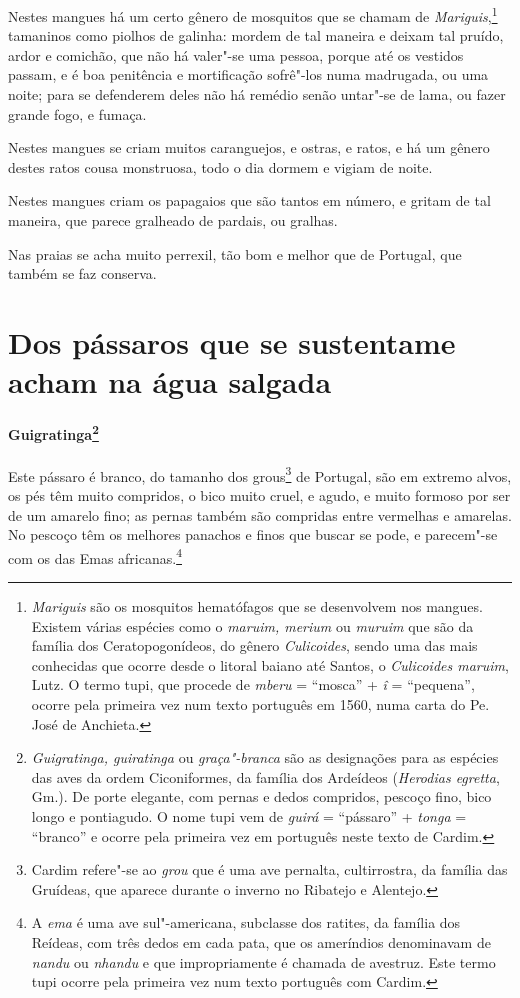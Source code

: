  Nestes mangues há um certo gênero de mosquitos que se chamam de
\textit{Mariguis},\footnote{ \textit{Mariguis} são os mosquitos
hematófagos que se desenvolvem nos mangues. Existem várias espécies
como o \textit{maruim, merium} ou \textit{muruim} que são da família
dos Ceratopogonídeos, do gênero \textit{Culicoides}, sendo uma das mais
conhecidas que ocorre desde o litoral baiano até Santos, o
\textit{Culicoides maruim}, Lutz. O termo tupi, que procede de
\textit{mberu} = ``mosca'' + \textit{î} = ``pequena'', ocorre pela primeira
vez num texto português em 1560, numa carta do Pe. José de
Anchieta.} tamaninos como piolhos de galinha: mordem de tal maneira e
deixam tal pruído, ardor e comichão, que não há valer"-se uma pessoa,
porque até os vestidos passam, e é boa penitência e mortificação
sofrê"-los numa madrugada, ou uma noite; para se defenderem deles não há
remédio senão untar"-se de lama, ou fazer grande fogo, e fumaça.

 Nestes mangues se criam muitos caranguejos, e ostras, e ratos, e há um
gênero destes ratos cousa monstruosa, todo o dia dormem e vigiam de noite.

 Nestes mangues criam os papagaios que são tantos em número, e gritam de
tal maneira, que parece gralheado de pardais, ou gralhas.

 Nas praias se acha muito perrexil, tão bom e melhor que de Portugal, 
que também se faz conserva.


\section[Dos pássaros que se sustentam e acham na água salgada]{Dos pássaros que se sustentam\break e acham na água salgada}
\paragraph{Guigratinga\footnote{ \textit{Guigratinga,
guiratinga} ou \textit{graça"-branca} são as designações para as
espécies das aves da ordem Ciconiformes, da família dos Ardeídeos
(\textit{Herodias egretta}, Gm.). De porte elegante, com pernas e dedos
compridos, pescoço fino, bico longo e pontiagudo. O nome tupi vem de
\textit{guirá} = ``pássaro'' + \textit{tonga} = ``branco'' e ocorre pela
primeira vez em português neste texto de Cardim.}} Este
pássaro é branco, do tamanho dos grous\footnote{ Cardim refere"-se ao
\textit{grou} que é uma ave pernalta, cultirrostra, da família das
Gruídeas, que aparece durante o inverno no Ribatejo e Alentejo.} de
Portugal, são em extremo alvos, os pés têm muito compridos, o bico
muito cruel, e agudo, e muito formoso por ser de um amarelo fino; as
pernas também são compridas entre vermelhas e amarelas. No pescoço têm
os melhores panachos e finos que buscar se pode, e parecem"-se com os
das Emas africanas.\footnote{ A \textit{ema} é uma ave sul"-americana,
subclasse dos ratites, da família dos Reídeas, com três dedos em cada
pata, que os ameríndios denominavam de \textit{nandu} ou
\textit{nhandu} e que impropriamente é chamada de avestruz. Este termo
tupi ocorre pela primeira vez num texto português com Cardim.} 

